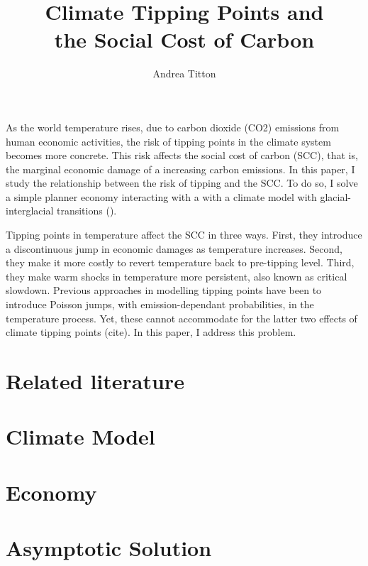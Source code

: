 \documentclass[american, abstract=on]{scrartcl}
\author{Andrea Titton}
\title{Climate Tipping Points and\\the Social Cost of Carbon}
\begin{document}
\maketitle

As the world temperature rises, due to carbon dioxide (CO2) emissions from human economic activities, the risk of tipping points in the climate system becomes more concrete. This risk affects the social cost of carbon (SCC), that is, the marginal economic damage of a increasing carbon emissions. In this paper, I study the relationship between the risk of tipping and the SCC. To do so, I solve a simple planner economy interacting with a with a climate model
with glacial-interglacial transitions (\cite{sellers_global_1969,mcgehee_quadratic_2014}). 


Tipping points in temperature affect the SCC in three ways. First, they introduce a discontinuous jump in economic damages as temperature increases. Second, they make it more costly to revert temperature back to pre-tipping level. Third, they make warm shocks in temperature more persistent, also known as critical slowdown. Previous approaches in modelling tipping points have been to introduce Poisson jumps, with emission-dependant probabilities, in the temperature process. Yet, these cannot accommodate for the latter two effects of climate tipping points (cite). In this paper, I address this problem.




\section{Related literature}
\section{Climate Model}



\section{Economy}



\section{Asymptotic Solution}



\nocite{*}
\newpage
\printbibliography
\end{document}
